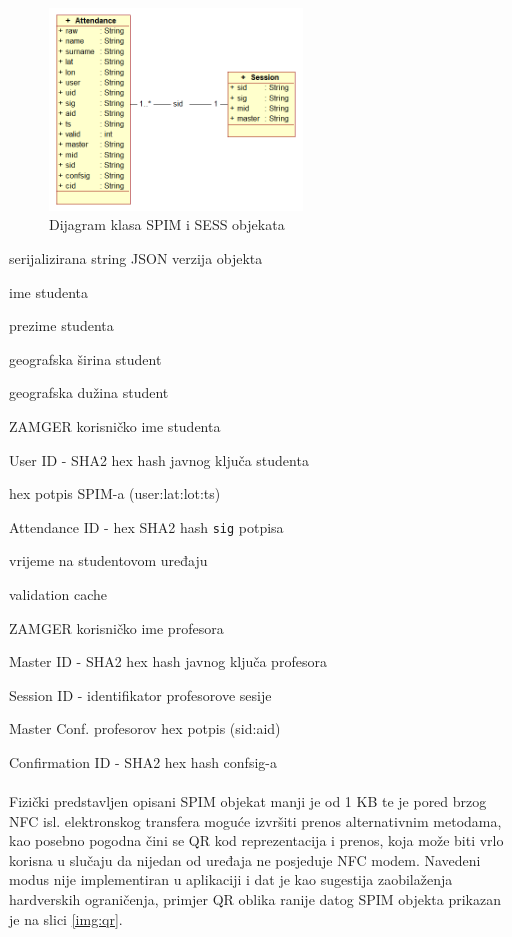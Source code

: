 \begin{figure}[H]
    \centering
    \includegraphics[width=0.6\textwidth]{material/classmodel}
    \caption{Dijagram klasa SPIM i SESS objekata}
\end{figure}
\begin{description}[align=right,labelwidth=2cm,noitemsep]
    \item [raw] serijalizirana string JSON verzija objekta
    \item [name] ime studenta
    \item [surname] prezime studenta
    \item [lat] geografska širina student
    \item [lon] geografska dužina student
    \item [user] ZAMGER korisničko ime studenta
    \item [uid] User ID - SHA2 hex hash javnog ključa studenta
    \item [sig] hex potpis SPIM-a (user:lat:lot:ts)
    \item [aid] Attendance ID - hex SHA2 hash \texttt{sig} potpisa
    \item [ts] vrijeme na studentovom uređaju
    \item [valid] validation cache
    \item [master] ZAMGER korisničko ime profesora
    \item [mid] Master ID - SHA2 hex hash javnog ključa profesora
    \item [sid] Session ID - identifikator profesorove sesije
    \item [confsig] Master Conf. profesorov hex potpis (sid:aid)
    \item [cid] Confirmation ID - SHA2 hex hash confsig-a
\end{description}

\paragraph*{}
Fizički predstavljen opisani SPIM objekat manji je od 1 KB te je pored brzog NFC isl. elektronskog transfera moguće izvršiti prenos alternativnim metodama, kao posebno pogodna čini se QR kod reprezentacija\cite{soon2008qr} i prenos, koja može biti vrlo korisna u slučaju da nijedan od uređaja ne posjeduje NFC modem. Navedeni modus nije implementiran u aplikaciji i dat je kao sugestija zaobilaženja hardverskih ograničenja, primjer QR oblika ranije datog SPIM objekta prikazan je na slici \ref{img:qr}.

